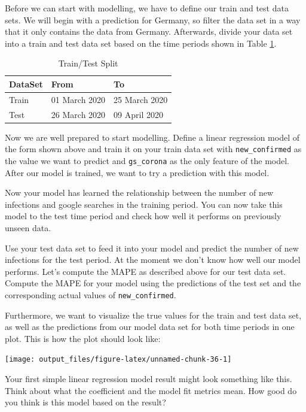 \documentclass[
  11pt,
]{article}
\begin{document}
Before we can start with modelling, we have to define our train and test data sets.
We will begin with a prediction for Germany, so filter the data set in a way that it only contains the data from Germany.
Afterwards, divide your data set into a train and test data set based on the time periods shown in Table \ref{tab:reg-table}.

\begin{table}

\caption{\label{tab:reg-table}Train/Test Split}
\centering
\begin{tabular}[t]{lll}
\toprule
DataSet & From & To\\
\midrule
Train & 01 March 2020 & 25 March 2020\\
Test & 26 March 2020 & 09 April 2020\\
\bottomrule
\end{tabular}
\end{table}

Now we are well prepared to start modelling.
Define a linear regression model of the form shown above and train it on your train
data set with \texttt{new\_confirmed} as the value we want to predict and \texttt{gs\_corona} as
the only feature of the model. After our model is trained, we want to try a prediction
with this model.

Now your model has learned the relationship between the number of new infections and google searches in the training period. You can now take this model to the test time period and check how well it performs on previously unseen data.

Use your test data set to feed it into your model and predict the number of new
infections for the test period. At the moment we don't know how well our model
performs. Let's compute the MAPE as described above for our test data set. Compute the MAPE for your model using the predictions of the test set and
the corresponding actual values of \texttt{new\_confirmed}.

Furthermore, we want to visualize the true values for the train and test data
set, as well as the predictions from our model data set for both time periods in one
plot. This is how the plot should look like:

\begin{center}\texttt{[image: output\_files/figure-latex/unnamed-chunk-36-1]} \end{center}

Your first simple linear regression model result might look something like this. Think about what the coefficient and the model fit metrics mean. How good do you think is this model based on the result?
\end{document}

